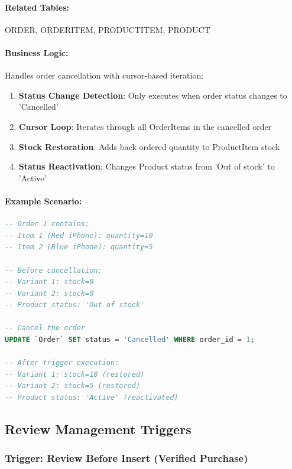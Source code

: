 \paragraph{Related Tables:} ORDER, ORDERITEM, PRODUCTITEM, PRODUCT

\paragraph{Business Logic:}
Handles order cancellation with cursor-based iteration:
\begin{enumerate}
    \item \textbf{Status Change Detection}: Only executes when order status changes to 'Cancelled'
    \item \textbf{Cursor Loop}: Iterates through all OrderItems in the cancelled order
    \item \textbf{Stock Restoration}: Adds back ordered quantity to ProductItem stock
    \item \textbf{Status Reactivation}: Changes Product status from 'Out of stock' to 'Active'
\end{enumerate}

\paragraph{Example Scenario:}

\begin{lstlisting}[language=SQL]
-- Order 1 contains:
-- Item 1 (Red iPhone): quantity=10
-- Item 2 (Blue iPhone): quantity=5

-- Before cancellation:
-- Variant 1: stock=0
-- Variant 2: stock=0
-- Product status: 'Out of stock'

-- Cancel the order
UPDATE `Order` SET status = 'Cancelled' WHERE order_id = 1;

-- After trigger execution:
-- Variant 1: stock=10 (restored)
-- Variant 2: stock=5 (restored)
-- Product status: 'Active' (reactivated)
\end{lstlisting}

\subsection{Review Management Triggers}

\subsubsection{Trigger: Review Before Insert (Verified Purchase)}

